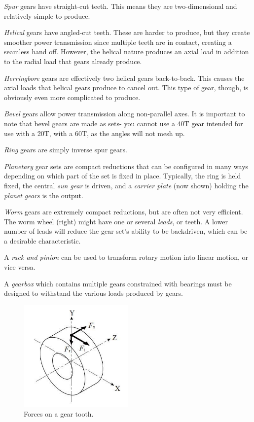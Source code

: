 \begin{asparaenum}[a)]
	\item \textit{Spur} gears have straight-cut teeth. This means they are two-dimensional and relatively simple to produce.
	\item \textit{Helical} gears have angled-cut teeth. These are harder to produce, but they create smoother power transmission since multiple teeth are in contact, creating a seamless hand off. However, the helical nature produces an axial load in addition to the radial load that gears already produce. 
	\item \textit{Herringbore} gears are effectively two helical gears back-to-back. This causes the axial loads that helical gears produce to cancel out. This type of gear, though, is obviously even more complicated to produce.
	\item \textit{Bevel} gears allow power transmission along non-parallel axes. It is important to note that bevel gears are made as sets- you cannot use a 40T gear intended for use with a 20T, with a 60T, as the angles will not mesh up.
	\item \textit{Ring} gears are simply inverse spur gears.
	\item \textit{Planetary} gear sets are compact reductions that can be configured in many ways depending on which part of the set is fixed in place. Typically, the ring is held fixed, the central \textit{sun gear} is driven, and a \textit{carrier plate} (now shown) holding the \textit{planet gears} is the output.
	\item \textit{Worm} gears are extremely compact reductions, but are often not very efficient. The worm wheel (right) might have one or several \textit{leads}, or teeth. A lower number of leads will reduce the gear set's ability to be backdriven, which can be a desirable characteristic.
	\item A \textit{rack and pinion} can be used to transform rotary motion into linear motion, or vice versa.	
\end{asparaenum}

A \textit{gearbox} which contains multiple gears constrained with bearings must be designed to withstand the various loads produced by gears.

\begin{figure}[H]
	\includegraphics[width=0.5\textwidth]{imgs/gear_forces.jpeg}
	\caption{Forces on a gear tooth.}
\end{figure}

